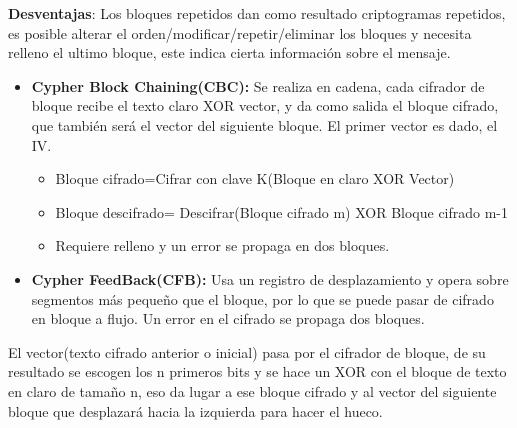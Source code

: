 \documentclass[12pt, twoside, openright]{report} %
\begin{document}
\textbf{Desventajas}: Los bloques repetidos dan como resultado criptogramas repetidos, es posible alterar el orden/modificar/repetir/eliminar los bloques y necesita relleno el ultimo bloque, este indica cierta información sobre el mensaje.
\begin{itemize}
	\item \textbf{Cypher Block Chaining(CBC):} Se realiza en cadena, cada cifrador de bloque recibe el texto claro XOR vector, y da como salida el bloque cifrado, que también será el vector del siguiente bloque. El primer vector es dado, el IV.
	      \begin{itemize}
		      \item Bloque cifrado=Cifrar con clave K(Bloque en claro XOR Vector)
		      \item Bloque descifrado= Descifrar(Bloque cifrado m) XOR Bloque cifrado m-1
		      \item Requiere relleno y un error se propaga en dos bloques.
	      \end{itemize}
	\item \textbf{Cypher FeedBack(CFB):} Usa un registro de desplazamiento y opera sobre segmentos más pequeño que el bloque, por lo que se puede pasar de cifrado en bloque a flujo. Un error en el cifrado se propaga dos bloques.
\end{itemize}

El vector(texto cifrado anterior o inicial) pasa por el cifrador de bloque, de su resultado se escogen los n primeros bits y se hace un XOR con el bloque de texto en claro de tamaño n, eso da lugar a ese bloque cifrado y al vector del siguiente bloque que desplazará hacia la izquierda para hacer el hueco.
\end{document}
